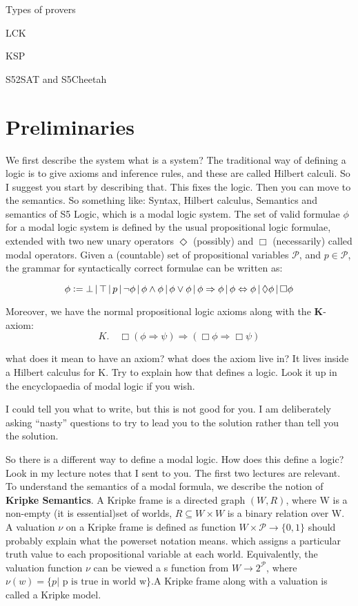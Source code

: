 \documentclass{article}
\newcommand{\defeq}{\vcentcolon=}
\newcommand{\raj}[1]{{\color{blue}#1\color{black}}}
\begin{document}
Types of provers 

LCK

KSP

S52SAT and S5Cheetah
\section{Preliminaries}
%

We first describe the system \raj{what is a system? The traditional way of defining a logic is to give axioms and inference rules, and these are called Hilbert calculi. So I suggest you start by describing that. This fixes the logic. Then you can move to the semantics. So
something like: Syntax, Hilbert calculus, Semantics} and semantics of S5 Logic, which is a modal logic system. The set of valid formulae $\phi$ for a modal logic system is defined by the usual propositional logic formulae, extended with two new unary operators $\Diamond$ (possibly) and $\Box$ (necessarily) called modal operators. Given a (countable) set of propositional variables $\mathcal{P}$, and $p \in \mathcal{P}$, the grammar for syntactically correct formulae can be written as:

\[
\phi \defeq \bot \, \vert \, \top \, \vert \, p \, \vert \, \neg \phi \, \vert \, \phi \wedge \phi \, \vert \, \phi \vee \phi \, \vert \, \phi \Rightarrow \phi \, \vert \, \phi \Leftrightarrow \phi \, \vert \, \Diamond \phi \, \vert \, \Box \phi
\]

Moreover, we have the normal propositional logic axioms along with the \textbf{K}-axiom:
\[
K. \quad \Box \left(\phi \Rightarrow \psi\right) \Rightarrow \left(\Box \phi \Rightarrow \Box \psi\right)
\]

\raj{what does it mean to have an axiom? what does the axiom live in? It lives inside a Hilbert calculus for K. Try to explain how that defines a logic. Look it up in the encyclopaedia of modal logic if you wish.}

\raj{I could tell you what to write, but this is not good for you. I am deliberately asking ``nasty'' questions to try to lead you to the solution rather than tell you the solution.}

\raj{So there is a different way to define a modal logic. How does this define a logic? Look in my lecture notes that I sent to you. The first two lectures are relevant.}
To understand the semantics of a modal formula, we describe the notion of \textbf{Kripke Semantics}. A Kripke frame is a directed graph $\left(W, R\right)$, where W is a \raj{non-empty (it is essential)}set of worlds, $R \subseteq W \times W$ is a binary relation over W. A valuation $\nu$ on a Kripke frame is defined as function $W \times \mathcal{P} \rightarrow \{0, 1\}$ \raj{should probably explain what the powerset notation means.} which assigns a particular truth value to each propositional variable at each world. Equivalently, the valuation function $\nu$ can be viewed a s function from $W \rightarrow 2^{\mathcal{P}}$, where $\nu(w) = \{p \vert \text{ p is true in world w}\}$.A Kripke frame along with a valuation is called a Kripke model. 
\end{document}
